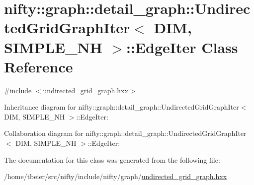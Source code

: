 \hypertarget{classnifty_1_1graph_1_1detail__graph_1_1UndirectedGridGraphIter_1_1EdgeIter}{}\section{nifty\+:\+:graph\+:\+:detail\+\_\+graph\+:\+:Undirected\+Grid\+Graph\+Iter$<$ D\+I\+M, S\+I\+M\+P\+L\+E\+\_\+\+N\+H $>$\+:\+:Edge\+Iter Class Reference}
\label{classnifty_1_1graph_1_1detail__graph_1_1UndirectedGridGraphIter_1_1EdgeIter}


{\ttfamily \#include $<$undirected\+\_\+grid\+\_\+graph.\+hxx$>$}



Inheritance diagram for nifty\+:\+:graph\+:\+:detail\+\_\+graph\+:\+:Undirected\+Grid\+Graph\+Iter$<$ D\+I\+M, S\+I\+M\+P\+L\+E\+\_\+\+N\+H $>$\+:\+:Edge\+Iter\+:


Collaboration diagram for nifty\+:\+:graph\+:\+:detail\+\_\+graph\+:\+:Undirected\+Grid\+Graph\+Iter$<$ D\+I\+M, S\+I\+M\+P\+L\+E\+\_\+\+N\+H $>$\+:\+:Edge\+Iter\+:


The documentation for this class was generated from the following file\+:\begin{DoxyCompactItemize}
\item 
/home/tbeier/src/nifty/include/nifty/graph/\hyperlink{graph_2undirected__grid__graph_8hxx}{undirected\+\_\+grid\+\_\+graph.\+hxx}\end{DoxyCompactItemize}
